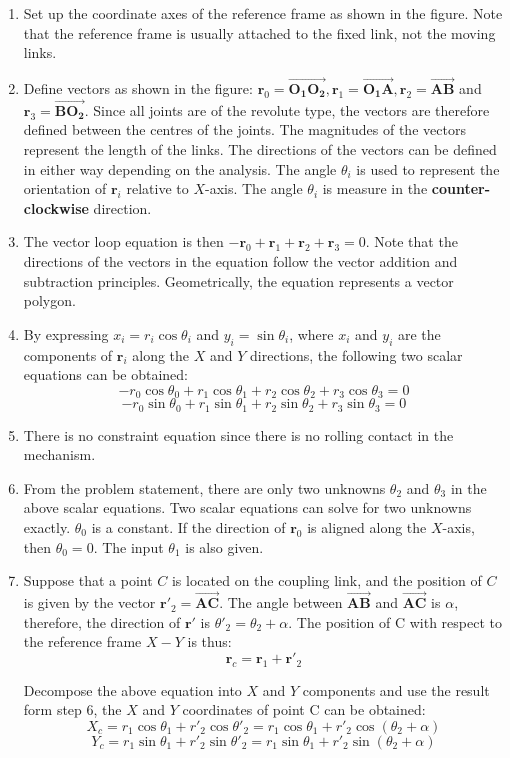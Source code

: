 \documentclass[11pt]{article}
\begin{document}
\begin{enumerate}
\item Set up the coordinate axes of the reference frame as shown in the figure. Note that the reference frame is usually attached to the fixed link, not the moving links.
\item Define vectors as shown in the figure: \(\boldsymbol{r}_0 = \boldsymbol{\overrightarrow{O_1 O_2}}, \boldsymbol{r}_1 = \boldsymbol{\overrightarrow{O_1 A}}, \boldsymbol{r}_2 = \boldsymbol{\overrightarrow{AB}}\) and \(\boldsymbol{r}_3 = \boldsymbol{\overrightarrow{BO_2}}\). Since all joints are of the revolute type, the vectors are therefore defined between the centres of the joints. The magnitudes of the vectors represent the length of the links. The directions of the vectors can be defined in either way depending on the analysis. The angle \(\theta_i\) is used to represent the orientation of \(\boldsymbol{r}_i\) relative to \(X\)-axis. The angle \(\theta_i\) is measure in the \textbf{counter-clockwise} direction.
\item The vector loop equation is then \(-\boldsymbol{r}_0 + \boldsymbol{r}_1 + \boldsymbol{r}_2 + \boldsymbol{r}_3 = 0\). Note that the directions of the vectors in the equation follow the vector addition and subtraction principles. Geometrically, the equation represents a vector polygon.
\item By expressing \(x_i = r_i \cos \theta_i\) and \(y_i = \sin \theta_i\), where \(x_i\) and \(y_i\) are the components of \(\boldsymbol{r}_i\) along the \(X\) and \(Y\) directions, the following two scalar equations can be obtained:
\[-r_0 \cos \theta_0 + r_1 \cos \theta_1 + r_2 \cos \theta_2 + r_3 \cos \theta_3 = 0\]
\[-r_0 \sin \theta_0 + r_1 \sin \theta_1 + r_2 \sin \theta_2 + r_3 \sin \theta_3 = 0\]
\item There is no constraint equation since there is no rolling contact in the mechanism.
\item From the problem statement, there are only two unknowns \(\theta_2\) and \(\theta_3\) in the above scalar equations. Two scalar equations can solve for two unknowns exactly. \(\theta_0\) is a constant. If the direction of \(\boldsymbol{r}_0\) is aligned along the \(X\)-axis, then \(\theta_0 = 0\). The input \(\theta_1\) is also given.
\item Suppose that a point \(C\) is located on the coupling link, and the position of \(C\) is given by the vector \(\boldsymbol{r'}_2 = \boldsymbol{\overrightarrow{AC}}\). The angle between \(\boldsymbol{\overrightarrow{AB}}\) and \(\boldsymbol{\overrightarrow{AC}}\) is \(\alpha\), therefore, the direction of \(\boldsymbol{r'}\) is \(\theta'_2 = \theta_2 + \alpha\). The position of C with respect to the reference frame \(X-Y\) is thus:
\[\boldsymbol{r}_c = \boldsymbol{r}_1 + \boldsymbol{r'}_2\]

Decompose the above equation into \(X\) and \(Y\) components and use the result form step 6, the \(X\) and \(Y\) coordinates of point C can be obtained:
\[X_c = r_1 \cos \theta_1 + r'_2 \cos \theta'_2 = r_1 \cos \theta_1 + r'_2 \cos (\theta_2 + \alpha)\]
\[Y_c = r_1 \sin \theta_1 + r'_2 \sin \theta'_2 = r_1 \sin \theta_1 + r'_2 \sin (\theta_2 + \alpha)\]
\end{enumerate}
\end{document}
